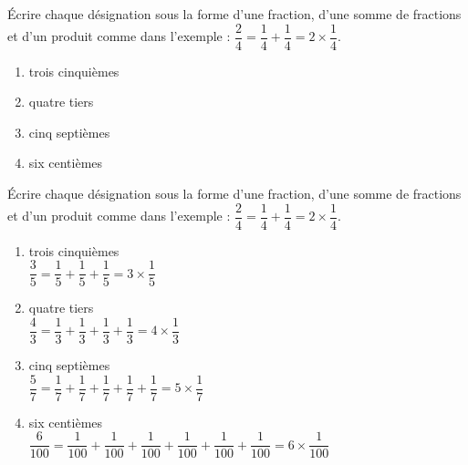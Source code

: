 \begin{exercice*}
    Écrire chaque désignation sous la forme d'une fraction, d'une somme de fractions et d'un produit comme dans l'exemple : $\dfrac24 =\dfrac14+\dfrac14 =2\times\dfrac14$. \smallskip
    \begin{multicols}{2}
        \begin{enumerate}
            \item trois cinquièmes
            \item quatre tiers
            \item cinq septièmes
            \item six centièmes
        \end{enumerate}
    \end{multicols}
 \end{exercice*}
\begin{corrige}
    Écrire chaque désignation sous la forme d'une fraction, d'une somme de fractions et d'un produit comme dans l'exemple : $\dfrac24 =\dfrac14+\dfrac14 =2\times\dfrac14$. \smallskip
    \begin{enumerate}
        \item trois cinquièmes\\
        {\red\small $\dfrac{3}{5}=\dfrac{1}{5}+\dfrac{1}{5}+\dfrac{1}{5}=3\times\dfrac{1}{5}$}
        \item quatre tiers\\
        {\red\small $\dfrac{4}{3}=\dfrac{1}{3}+\dfrac{1}{3}+\dfrac{1}{3}+\dfrac{1}{3}=4\times\dfrac{1}{3}$}
        \item cinq septièmes\\
        {\red\small $\dfrac{5}{7}=\dfrac{1}{7}+\dfrac{1}{7}+\dfrac{1}{7}+\dfrac{1}{7}+\dfrac{1}{7}=5\times\dfrac{1}{7}$}
        \item six centièmes\\
        {\red\small $\dfrac{6}{100}=\dfrac{1}{100}+\dfrac{1}{100}+\dfrac{1}{100}+\dfrac{1}{100}+\dfrac{1}{100}+\dfrac{1}{100}=6\times\dfrac{1}{100}$}
    \end{enumerate}    
\end{corrige}
    
    